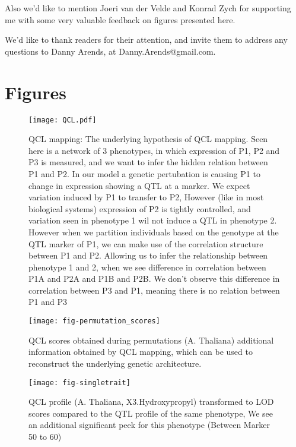 \documentclass[12pt]{article}
\begin{document}
Also we'd like to mention Joeri van der Velde and Konrad Zych for supporting me with some very 
valuable feedback on figures presented here.

We'd like to thank readers for their attention, and invite them to 
address any questions to Danny Arends, at Danny.Arends@gmail.com.

\newpage



\newpage

\section*{Figures}

\begin{figure}[ht]
  \centerline{\texttt{[image: QCL.pdf]}}
  \caption{QCL mapping: The underlying hypothesis of QCL mapping. Seen here is a network of 3 phenotypes, in 
  which expression of P1, P2 and P3 is measured, and we want to infer the hidden relation between P1 
  and P2. In our model a genetic pertubation is causing P1 to change in expression showing a QTL at a marker. We expect variation 
  induced by P1 to transfer to P2, However (like in most biological systems) expression of P2 is tightly controlled, 
  and variation seen in phenotype 1 wil not induce a QTL in phenotype 2. However when we partition individuals based 
  on the genotype at the QTL marker of P1, we can make use of the correlation structure between P1 and P2. Allowing 
  us to infer the relationship between phenotype 1 and 2, when we see difference in correlation between P1A and P2A 
  and P1B and P2B. We don't observe this difference in correlation between P3 and P1, meaning there is no relation 
  between P1 and P3}
  \label{QCL_img}
\end{figure}

\begin{figure}[ht]
  \centering
\texttt{[image: fig-permutation\_scores]}
  \caption{QCL scores obtained during permutations (A. Thaliana) additional information obtained by QCL mapping, 
  which can be used to reconstruct the underlying genetic architecture.\label{fig:histPermAra}}
\end{figure}

\begin{figure}
  \centering
\texttt{[image: fig-singletrait]}
  \caption{QCL profile (A. Thaliana, X3.Hydroxypropyl) transformed to LOD scores compared to the QTL profile of the same phenotype, We see an 
  additional significant peek for this phenotype (Between Marker 50 to 60) \label{fig:singletrait}}
\end{figure}
\end{document}

